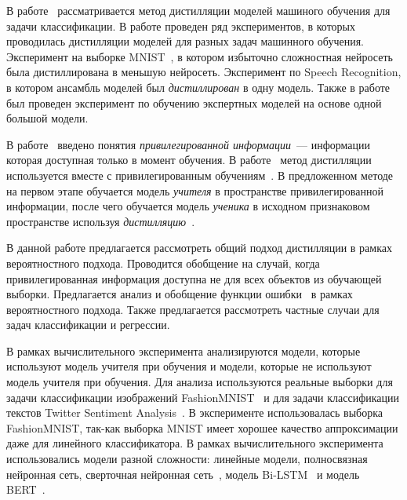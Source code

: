 \documentclass[12pt, twoside]{article}
\begin{document}
В работе~\cite{Hinton2015} рассматривается метод дистилляции моделей машиного обучения для задачи классификации. В работе проведен ряд экспериментов, в которых проводилась дистилляции моделей для разных задач машинного обучения. Эксперимент на выборке MNIST~\cite{mnist}, в котором избыточно сложностная нейросеть была дистиллирована в меньшую нейросеть. Эксперимент по Speech Recognition, в котором ансамбль моделей был \textit{дистиллирован} в одну модель. Также в работе~\cite{Hinton2015} был проведен эксперимент по обучению экспертных моделей на основе одной большой модели.

В работе~\cite{Vapnik2015} введено понятия \textit{привилегированной информации}~--- информации которая доступная только в момент обучения. В работе~\cite{Lopez2016} метод дистилляции~\cite{Hinton2015} используется вместе с привилегированным обучениям~\cite{Vapnik2015}. В предложенном методе на первом этапе обучается модель \textit{учителя} в пространстве привилегированной информации, после чего обучается модель \textit{ученика} в исходном признаковом пространстве используя \textit{дистилляцию}~\cite{Hinton2015}.

В данной работе предлагается рассмотреть общий подход дистилляции в рамках вероятностного подхода. Проводится обобщение на случай, когда привилегированная информация доступна не для всех объектов из обучающей выборки. Предлагается анализ и обобщение функции ошибки~\cite{Hinton2015, Lopez2016} в рамках вероятностного подхода. Также предлагается рассмотреть частные случаи для задач классификации и регрессии. 

В рамках вычислительного эксперимента анализируются модели, которые используют модель учителя при обучения  и модели, которые не используют модель учителя при обучения. Для анализа используются реальные выборки для задачи классификации изображений FashionMNIST~\cite{fashionmnist} и для задачи классификации текстов Twitter Sentiment Analysis~\cite{twiter2013}. В эксперименте использовалась выборка FashionMNIST, так-как выборка MNIST имеет хорошее качество аппроксимации даже для линейного классификатора. В рамках вычислительного эксперимента использовались модели разной сложности: линейные модели, полносвязная нейронная сеть, сверточная нейронная сеть~\cite{LeCun1989}, модель Bi-LSTM~\cite{Schmidhuber1997} и модель BERT~\cite{Devlin2018}.
\end{document}
